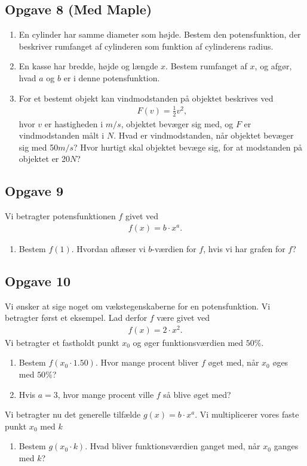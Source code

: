 \subsection*{Opgave 8 (Med Maple)}
\begin{enumerate}[label=\roman*)]
\item En cylinder har samme diameter som højde. Bestem den potensfunktion, der beskriver rumfanget af cylinderen som funktion af cylinderens radius. 
\item En kasse har bredde, højde og længde $x$. Bestem rumfanget af $x$, og afgør, hvad $a$ og $b$ er i denne potensfunktion.
\item For et bestemt objekt kan vindmodstanden på objektet beskrives ved 
\begin{align*}
F(v)= \frac{1}{2}v^2,
\end{align*}
hvor $v$ er hastigheden i $m/s$, objektet bevæger sig med, og $F$ er vindmodstanden målt i $N$. Hvad er vindmodstanden, når objektet bevæger sig med 50$m/s$? Hvor hurtigt skal objektet bevæge sig, for at modstanden på objektet er 20$N$?

\end{enumerate}

\subsection*{Opgave 9}

Vi betragter potensfunktionen $f$ givet ved
\begin{align*}
	f(x) = b\cdot x^a.
\end{align*}

\begin{enumerate}[label = \roman*)]
	\item Bestem $f(1)$. Hvordan aflæser vi $b$-værdien for $f$, hvis vi har grafen for $f$?
\end{enumerate}


\subsection*{Opgave 10}

Vi ønsker at sige noget om vækstegenskaberne for en potensfunktion. Vi betragter først et eksempel. Lad derfor $f$ være givet ved
\begin{align*}
	f(x) = 2 \cdot x^2.
\end{align*}
Vi betragter et fastholdt punkt $x_0$ og øger funktionsværdien med $50\%$.
\begin{enumerate}[label = \roman*)]
	\item Bestem $f(x_0\cdot 1.50)$. Hvor mange procent bliver $f$ øget med, når $x_0$ øges med $50\%$?
	\item Hvis $a = 3$, hvor mange procent ville $f$ så blive øget med?
\end{enumerate}
Vi betragter nu det generelle tilfælde $g(x) = b\cdot x^a$. Vi multiplicerer vores faste punkt $x_0$ med $k$
\begin{enumerate}[label=\roman*)]
	\item Bestem $g(x_0 \cdot k)$. Hvad bliver funktionsværdien ganget med, når $x_0$ ganges med $k$? 
\end{enumerate}
